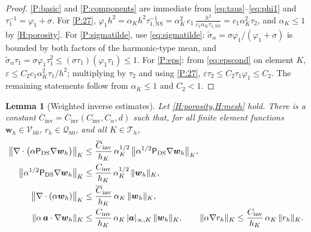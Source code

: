 \documentclass[11pt,a4paper]{article}
\newcommand{\ba}{\boldsymbol{a}}
\newcommand{\ViscProj}{\mathsf{P}_{\mathrm{DS}}}
\newcommand{\Th}{\mathcal{T}_h}
\newcommand{\Cinv}{C_{\mathrm{inv}}}
\newcommand{\Cinva}{\overline{C}_{\mathrm{inv}}}
\DeclarePairedDelimiter{\norm}{\lVert}{\rVert}
\newcommand{\sigmatilde}{\widetilde{\sigma}_{\alpha}}
\theoremstyle{plain}
\newtheorem{lemma}{Lemma}[section]
\theoremstyle{remark}
\theoremstyle{definition}
\numberwithin{equation}{section}
\begin{document}
\begin{proof}
\ref{P:basic} and \ref{P:components} are immediate from
\eqref{eq:taus}--\eqref{eq:phi1} and $\tau_1^{-1}=\varphi_1+\sigma$.
For \ref{P:27}, $\varphi_1 h^2=\alpha_K h^2\tau_{1,\mathrm{NS}}^{-1}
= \alpha_K^2\, c_1\, \frac{h^2}{c_1\alpha_K\tau_{1,\mathrm{NS}}} = c_1\alpha_K^2\tau_2$,
and $\alpha_K\le1$ by \cref{H:porosity}. For \ref{P:sigmatilde}, use
\eqref{eq:sigmatilde}: $\sigmatilde=\sigma\varphi_1/(\varphi_1+\sigma)$ is bounded by both
factors of the harmonic-type mean, and
$\sigmatilde\tau_1=\sigma\varphi_1\tau_1^2\le(\sigma\tau_1)(\varphi_1\tau_1)\le1$.
For \ref{P:eps}: from \eqref{eq:epscond} on element $K$,
$\varepsilon\le C_2 c_1\alpha_K^2\tau_1/h^2$; multiplying by $\tau_2$ and using
\ref{P:27}, $\varepsilon\tau_2\le C_2\tau_1\varphi_1\le C_2$. The remaining statements
follow from $\alpha_K\le 1$ and $C_2<1$.
\end{proof}

\begin{lemma}[Weighted inverse estimates]\label{lem:winv}
Let \cref{H:porosity,H:mesh} hold. There is a constant
$\Cinva = \Cinva(\Cinv,C_\alpha,d)$ such that, for all
finite element functions $\boldsymbol{w}_h\in\mathcal{V}_{h0}$,
$r_h\in\mathcal{Q}_{h0}$, and all $K\in\Th$,
\begin{align}
  \bigl\lVert\nabla\cdot\bigl(\alpha\ViscProj\nabla\boldsymbol{w}_h\bigr)
  \bigr\rVert_{K}
  &\le \frac{\Cinva}{h_K}\,\alpha_K^{1/2}\,
  \bigl\lVert\alpha^{1/2}\ViscProj\nabla\boldsymbol{w}_h\bigr\rVert_{K},
  \label{eq:winv-divvisc}\\
  \bigl\lVert\alpha^{1/2}\ViscProj\nabla\boldsymbol{w}_h\bigr\rVert_{K}
  &\le \frac{\Cinv}{h_K}\,\alpha_K^{1/2}\,
  \norm{\boldsymbol{w}_h}_{K},
  \label{eq:winv-grad}\\
  \bigl\lVert\nabla\cdot(\alpha\boldsymbol{w}_h)\bigr\rVert_{K}
  &\le \frac{\Cinva}{h_K}\,\alpha_K\,\norm{\boldsymbol{w}_h}_{K},
  \label{eq:winv-divu}\\
  \norm{\alpha\,\ba\cdot\nabla\boldsymbol{w}_h}_{K}
  &\le \frac{\Cinv}{h_K}\,\alpha_K\,|\ba|_{\infty,K}\,
  \norm{\boldsymbol{w}_h}_{K},
  \qquad
  \norm{\alpha\nabla r_h}_{K}
  \le \frac{\Cinv}{h_K}\,\alpha_K\,\norm{r_h}_{K}.
  \label{eq:winv-conv}
\end{align}
\end{lemma}
\end{document}
